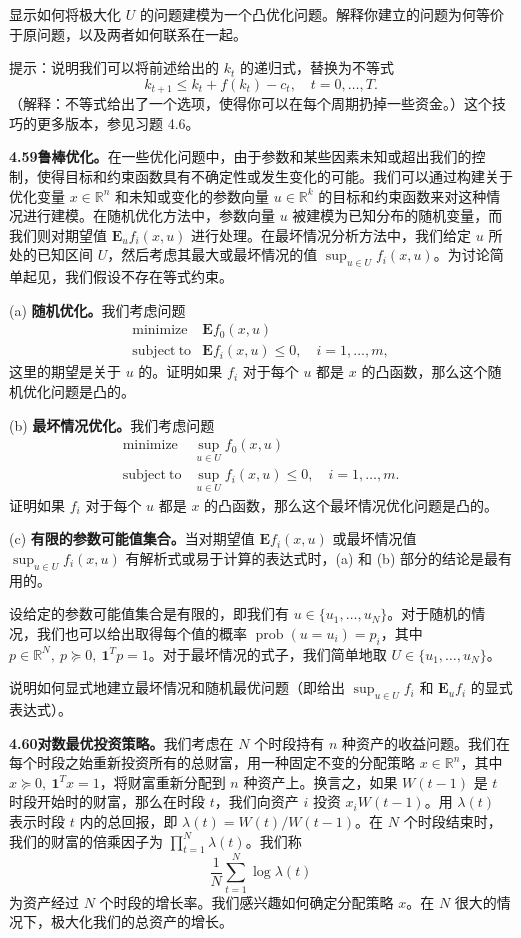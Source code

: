 \documentclass[UTF8,12pt,a4paper,fontset=fandol]{ctexart}
\begin{document}
显示如何将极大化 $U$ 的问题建模为一个凸优化问题。解释你建立的问题为何等价于原问题，以及两者如何联系在一起。

提示：说明我们可以将前述给出的 $k_t$ 的递归式，替换为不等式
\[
k_{t+1}\leq k_t+f(k_t)-c_t,\quad t=0,\ldots,T.
\]
（解释：不等式给出了一个选项，使得你可以在每个周期扔掉一些资金。）这个技巧的更多版本，参见习题 4.6。

\noindent\textbf{4.59\quad 鲁棒优化。}\quad 在一些优化问题中，由于参数和某些因素未知或超出我们的控制，使得目标和约束函数具有不确定性或发生变化的可能。我们可以通过构建关于优化变量 $x\in\mathbb{R}^n$ 和未知或变化的参数向量 $u\in\mathbb{R}^k$ 的目标和约束函数来对这种情况进行建模。在随机优化方法中，参数向量 $u$ 被建模为已知分布的随机变量，而我们则对期望值 $\mathbf{E}_u f_i(x,u)$ 进行处理。在最坏情况分析方法中，我们给定 $u$ 所处的已知区间 $U$，然后考虑其最大或最坏情况的值 $\sup_{u\in U} f_i(x,u)$。为讨论简单起见，我们假设不存在等式约束。

(a) \textbf{随机优化。}\quad 我们考虑问题
\[
\begin{array}{ll}
\mathop{\mathrm{minimize}} & \mathbf{E}f_0(x,u)\\
\mathrm{subject\ to} & \mathbf{E}f_i(x,u)\leq0,\quad i=1,\ldots,m,
\end{array}
\]
这里的期望是关于 $u$ 的。证明如果 $f_i$ 对于每个 $u$ 都是 $x$ 的凸函数，那么这个随机优化问题是凸的。

(b) \textbf{最坏情况优化。}\quad 我们考虑问题
\[
\begin{array}{ll}
\mathop{\mathrm{minimize}} & \sup_{u\in U} f_0(x,u)\\
\mathrm{subject\ to} & \sup_{u\in U} f_i(x,u)\leq0,\quad i=1,\ldots,m.
\end{array}
\]
证明如果 $f_i$ 对于每个 $u$ 都是 $x$ 的凸函数，那么这个最坏情况优化问题是凸的。

(c) \textbf{有限的参数可能值集合。}\quad 当对期望值 $\mathbf{E}f_i(x,u)$ 或最坏情况值 $\sup_{u\in U}f_i(x,u)$ 有解析式或易于计算的表达式时，(a) 和 (b) 部分的结论是最有用的。

设给定的参数可能值集合是有限的，即我们有 $u\in\{u_1,\ldots,u_N\}$。对于随机的情况，我们也可以给出取得每个值的概率 $\operatorname{prob}(u=u_i)=p_i$，其中 $p\in\mathbb{R}^N,\ p\succeq0,\ \mathbf{1}^Tp=1$。对于最坏情况的式子，我们简单地取 $U\in\{u_1,\ldots,u_N\}$。

说明如何显式地建立最坏情况和随机最优问题（即给出 $\sup_{u\in U}f_i$ 和 $\mathbf{E}_u f_i$ 的显式表达式）。

\noindent\textbf{4.60\quad 对数最优投资策略。}\quad 我们考虑在 $N$ 个时段持有 $n$ 种资产的收益问题。我们在每个时段之始重新投资所有的总财富，用一种固定不变的分配策略 $x\in\mathbb{R}^n$，其中 $x\succeq0,\ \mathbf{1}^Tx=1$，将财富重新分配到 $n$ 种资产上。换言之，如果 $W(t-1)$ 是 $t$ 时段开始时的财富，那么在时段 $t$，我们向资产 $i$ 投资 $x_iW(t-1)$。用 $\lambda(t)$ 表示时段 $t$ 内的总回报，即 $\lambda(t)=W(t)/W(t-1)$。在 $N$ 个时段结束时，我们的财富的倍乘因子为 $\prod_{t=1}^N\lambda(t)$。我们称
\[
\frac{1}{N}\sum_{t=1}^N\log\lambda(t)
\]
为资产经过 $N$ 个时段的增长率。我们感兴趣如何确定分配策略 $x$。在 $N$ 很大的情况下，极大化我们的总资产的增长。
\end{document}
